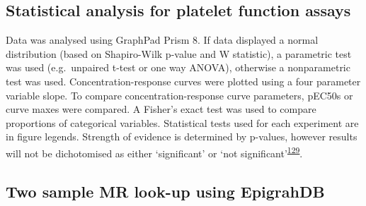 \documentclass[11pt,twoside]{bristolthesis}
\begin{document}
\hypertarget{statistical-analysis-for-platelet-function-assays-1}{%
\subsection{Statistical analysis for platelet function assays}\label{statistical-analysis-for-platelet-function-assays-1}}

Data was analysed using GraphPad Prism 8. If data displayed a normal distribution (based on Shapiro-Wilk p-value and W statistic), a parametric test was used (e.g.~unpaired t-test or one way ANOVA), otherwise a nonparametric test was used. Concentration-response curves were plotted using a four parameter variable slope. To compare concentration-response curve parameters, pEC50s or curve maxes were compared. A Fisher's exact test was used to compare proportions of categorical variables. Statistical tests used for each experiment are in figure legends. Strength of evidence is determined by p-values, however results will not be dichotomised as either `significant' or `not significant'\textsuperscript{\protect\hyperlink{ref-Sterne2001}{129}}.

\hypertarget{two-sample-mr-look-up-using-epigrahdb}{%
\subsection{Two sample MR look-up using EpigrahDB}\label{two-sample-mr-look-up-using-epigrahdb}}
\end{document}
